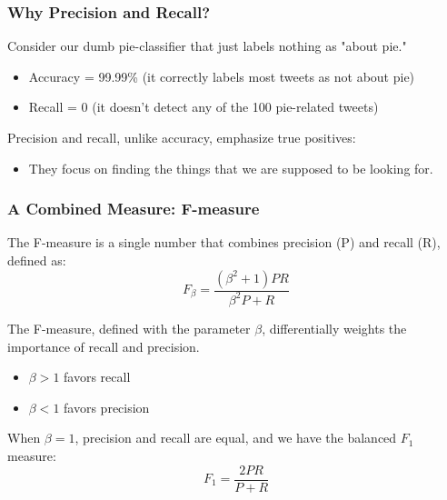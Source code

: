\documentclass[handout]{beamer}
\begin{document}
\begin{frame}
\frametitle{Why Precision and Recall?}
Consider our dumb pie-classifier that just labels nothing as "about pie."

\begin{itemize}
  \item Accuracy = 99.99\% (it correctly labels most tweets as not about pie)
  \item Recall = 0 (it doesn't detect any of the 100 pie-related tweets)
\end{itemize}

Precision and recall, unlike accuracy, emphasize true positives:
\begin{itemize}
  \item They focus on finding the things that we are supposed to be looking for.
\end{itemize}
\end{frame}



\begin{frame}
\frametitle{A Combined Measure: F-measure}
The F-measure is a single number that combines precision (P) and recall (R), defined as:
\[
F_\beta = \frac{(\beta^2+1)PR}{\beta^2P + R}
\]

The F-measure, defined with the parameter $\beta$, differentially weights the importance of recall and precision. 
\begin{itemize}
  \item $\beta > 1$ favors recall
  \item $\beta < 1$ favors precision
\end{itemize}

When $\beta = 1$, precision and recall are equal, and we have the balanced $F_1$ measure:
\[
F_1 = \frac{2PR}{P + R}
\]
\end{frame}
\end{document}
